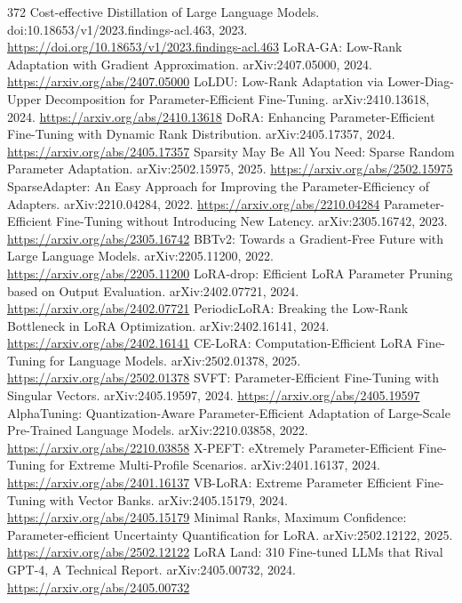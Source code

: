 \documentclass[11pt]{article}
\begin{document}
\begin{thebibliography}{372}
 Cost-effective Distillation of Large Language Models. doi:10.18653/v1/2023.findings-acl.463, 2023. \url{https://doi.org/10.18653/v1/2023.findings-acl.463}
 LoRA-GA: Low-Rank Adaptation with Gradient Approximation. arXiv:2407.05000, 2024. \url{https://arxiv.org/abs/2407.05000}
 LoLDU: Low-Rank Adaptation via Lower-Diag-Upper Decomposition for Parameter-Efficient Fine-Tuning. arXiv:2410.13618, 2024. \url{https://arxiv.org/abs/2410.13618}
 DoRA: Enhancing Parameter-Efficient Fine-Tuning with Dynamic Rank Distribution. arXiv:2405.17357, 2024. \url{https://arxiv.org/abs/2405.17357}
 Sparsity May Be All You Need: Sparse Random Parameter Adaptation. arXiv:2502.15975, 2025. \url{https://arxiv.org/abs/2502.15975}
 SparseAdapter: An Easy Approach for Improving the Parameter-Efficiency of Adapters. arXiv:2210.04284, 2022. \url{https://arxiv.org/abs/2210.04284}
 Parameter-Efficient Fine-Tuning without Introducing New Latency. arXiv:2305.16742, 2023. \url{https://arxiv.org/abs/2305.16742}
 BBTv2: Towards a Gradient-Free Future with Large Language Models. arXiv:2205.11200, 2022. \url{https://arxiv.org/abs/2205.11200}
 LoRA-drop: Efficient LoRA Parameter Pruning based on Output Evaluation. arXiv:2402.07721, 2024. \url{https://arxiv.org/abs/2402.07721}
 PeriodicLoRA: Breaking the Low-Rank Bottleneck in LoRA Optimization. arXiv:2402.16141, 2024. \url{https://arxiv.org/abs/2402.16141}
 CE-LoRA: Computation-Efficient LoRA Fine-Tuning for Language Models. arXiv:2502.01378, 2025. \url{https://arxiv.org/abs/2502.01378}
 SVFT: Parameter-Efficient Fine-Tuning with Singular Vectors. arXiv:2405.19597, 2024. \url{https://arxiv.org/abs/2405.19597}
 AlphaTuning: Quantization-Aware Parameter-Efficient Adaptation of Large-Scale Pre-Trained Language Models. arXiv:2210.03858, 2022. \url{https://arxiv.org/abs/2210.03858}
 X-PEFT: eXtremely Parameter-Efficient Fine-Tuning for Extreme Multi-Profile Scenarios. arXiv:2401.16137, 2024. \url{https://arxiv.org/abs/2401.16137}
 VB-LoRA: Extreme Parameter Efficient Fine-Tuning with Vector Banks. arXiv:2405.15179, 2024. \url{https://arxiv.org/abs/2405.15179}
 Minimal Ranks, Maximum Confidence: Parameter-efficient Uncertainty Quantification for LoRA. arXiv:2502.12122, 2025. \url{https://arxiv.org/abs/2502.12122}
 LoRA Land: 310 Fine-tuned LLMs that Rival GPT-4, A Technical Report. arXiv:2405.00732, 2024. \url{https://arxiv.org/abs/2405.00732}

\end{thebibliography}
\end{document}
